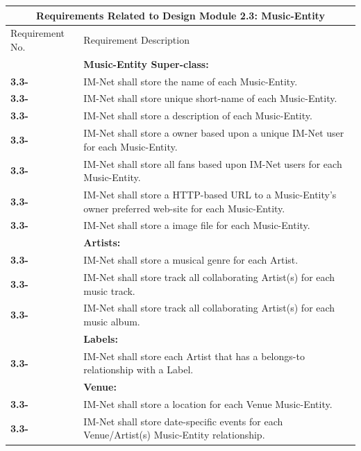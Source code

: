 \documentclass[letterpaper,12pt]{article}
\newcounter{rcounter}						%
\newcommand\rnumber{\stepcounter{rcounter}\arabic{rcounter}}
\begin{document}
{\setcounter{rcounter}{0}
\begin{center}
\begin{tabular}{|l|p{6in}|}
\hline 
\multicolumn{2}{|c|}{\textbf{Requirements Related to Design Module 2.3: Music-Entity}} \\ 
\hline 
Requirement No. & Requirement Description \\ 
\hline
& \textbf{Music-Entity Super-class:} \\
\hline
\textbf{3.3-\rnumber} & IM-Net shall store the name of each Music-Entity. \\ 
\hline
\textbf{3.3-\rnumber} & IM-Net shall store unique short-name of each Music-Entity. \\ 
\hline 
\textbf{3.3-\rnumber} & IM-Net shall store a description of each Music-Entity. \\ 
\hline 
\textbf{3.3-\rnumber} & IM-Net shall store a owner based upon a unique IM-Net user for each Music-Entity. \\ 
\hline 
\textbf{3.3-\rnumber} & IM-Net shall store all fans based upon IM-Net users for each Music-Entity. \\ 
\hline 
\textbf{3.3-\rnumber} & IM-Net shall store a HTTP-based URL to a Music-Entity's owner preferred web-site for each Music-Entity. \\ 
\hline
\textbf{3.3-\rnumber} & IM-Net shall store a image file for each Music-Entity. \\ 
\hline
& \textbf{Artists:} \\
\hline
\textbf{3.3-\rnumber} & IM-Net shall store a musical genre for each Artist. \\ 
\hline 
\textbf{3.3-\rnumber} & IM-Net shall store track all collaborating Artist(s) for each music track. \\ 
\hline
\textbf{3.3-\rnumber} & IM-Net shall store track all collaborating Artist(s) for each music album. \\ 
\hline
& \textbf{Labels:} \\
\hline
\textbf{3.3-\rnumber} & IM-Net shall store each Artist that has a belongs-to relationship with a Label. \\ 
\hline 
& \textbf{Venue:} \\
\hline
\textbf{3.3-\rnumber} & IM-Net shall store a location for each Venue Music-Entity. \\ 
\hline 
\textbf{3.3-\rnumber} & IM-Net shall store date-specific events for each Venue/Artist(s) Music-Entity relationship. \\ 
\hline


\end{tabular}
\end{center}}
\end{document}

